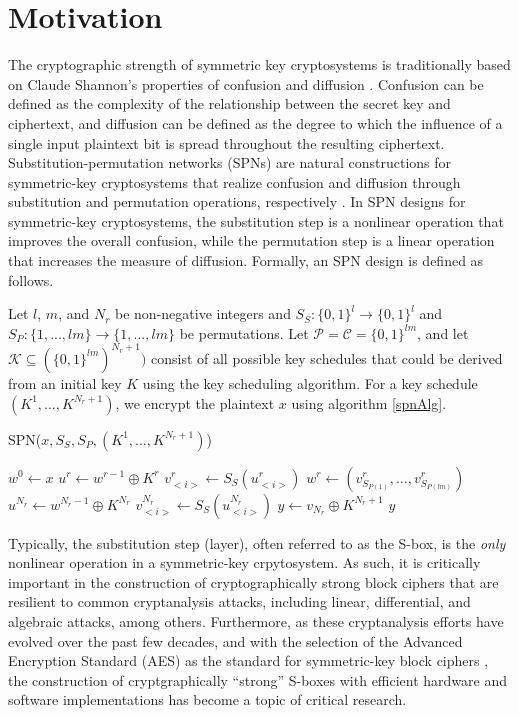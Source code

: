 \section{Motivation}
The cryptographic strength of symmetric key cryptosystems is traditionally based on 
Claude Shannon's properties of confusion and diffusion \cite{shannon1949-secrecy}. 
Confusion can be defined as the complexity of the relationship between the secret key and 
ciphertext, and diffusion can be defined as the degree to which the influence of 
a single input plaintext bit is spread throughout the resulting ciphertext.
Substitution-permutation networks (SPNs) are natural constructions for symmetric-key
cryptosystems that realize confusion and diffusion through substitution and
permutation operations, respectively \cite{stinson-crypto}. 
In SPN designs for symmetric-key cryptosystems, the substitution step is a
nonlinear operation that improves the overall confusion, while the permutation step
is a linear operation that increases the measure of diffusion. Formally, an SPN design is defined as follows.

\begin{definition}
Let $l$, $m$, and $N_r$ be non-negative integers and $S_S : \{0, 1\}^l \to \{0,1\}^l$ and $S_P : \{1,...,lm\} \to \{1,...,lm\}$ be permutations. Let $\mathcal{P} = \mathcal{C} = \{0,1\}^{lm}$, and let $\mathcal{K} \subseteq (\{0,1\}^{lm})^{N_r + 1})$ consist of all possible key schedules that could be derived from an initial key $K$ using the key scheduling algorithm. For a key schedule $(K^1, ..., K^{N_r + 1})$, we encrypt the plaintext $x$ using algorithm \ref{spnAlg}.

\begin{algorithm}
\caption{SPN($x, S_S, S_P, (K^1, \dots, K^{N_r + 1})$)} \label{spnAlg}
\begin{algorithmic}
	\State $w^0 \gets x$
		\State $u^r \gets w^{r - 1} \oplus K^r$
			\State $v^r_{<i>} \gets S_S(u^r_{<i>})$
		\EndFor
		\State $w^r \gets (v^r_{S_{P(1)}}, \dots, v^r_{S_{P(lm)}})$
	\EndFor
	\State $u^{N_r} \gets w^{N_r - 1} \oplus K^{N_r}$
		\State $v^{N_r}_{<i>} \gets S_S(u^{N_r}_{<i>})$
	\EndFor
	\State $y \gets v_{N_r} \oplus K^{N_r + 1}$
	\State \Return $y$
\end{algorithmic}
\end{algorithm}
\end{definition}

Typically, the substitution step (layer), often referred to as the S-box, is the \emph{only} nonlinear operation in a symmetric-key crpytosystem. As such, it is critically important in the construction of cryptographically strong block ciphers that are resilient to common cryptanalysis attacks, including linear, differential, and algebraic attacks, among others. Furthermore, as these cryptanalysis efforts have evolved over the past few decades, and with the selection of the Advanced Encryption Standard (AES) as the standard for symmetric-key block ciphers \cite{daemen01-AES}, the construction of cryptgraphically ``strong'' S-boxes with efficient hardware and software implementations has become a topic of critical research. 

